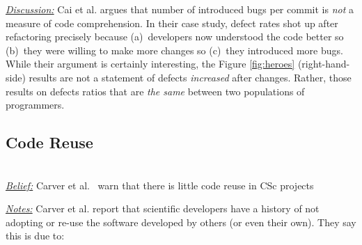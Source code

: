 \documentclass[conference,10pt]{IEEEtran}
\begin{document}




\noindent \textit{\underline{Discussion:}} 
Cai et al. \cite{cai19_debt} argues that number of introduced bugs
per commit is {\em not} a measure of code comprehension.
In their case study, defect rates shot up after refactoring
precisely because (a)~developers now understood the code better so (b)~they were willing to make more changes so (c)~they
introduced more bugs. While their argument is certainly interesting, the Figure \ref{fig:heroes} (right-hand-side) results
are not a statement of defects {\em increased} after changes.
Rather, those results on defects ratios that are {\em the same} between two populations of programmers. 




\subsection{Code Reuse} ~\\
\noindent \textit{\underline{Belief:}} 
Carver et al.~\cite{segal07_problem, carver06_hpc, Shull05_parallel, sanders08_risk} warn that there is little
code reuse in CSc projects

\noindent \textit{\underline{Notes:}} 
Carver et al. report that scientific developers have a history of not adopting or re-use the software developed by others (or even their own). They 
say this is due to:
\end{document}
